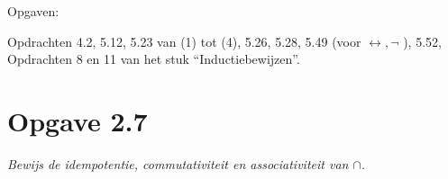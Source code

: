 \documentclass[11pt]{article}
\begin{document}
Opgaven:

Opdrachten 4.2, 5.12, 5.23 van (1) tot (4), 5.26, 5.28,
5.49 (voor $ { \leftrightarrow, \neg } $ ), 5.52, \\
Opdrachten 8 en 11 van het stuk “Inductiebewijzen”.

\section*{Opgave 2.7}
\textit{Bewijs de idempotentie, commutativiteit en associativiteit van
$ \cap $.}
\\

\end{document}

